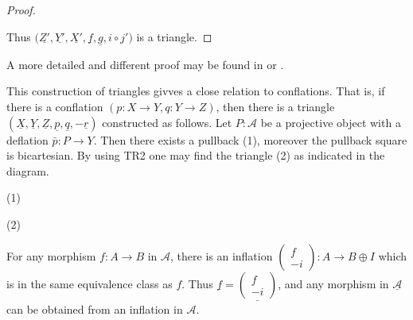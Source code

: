 \begin{proof}
\begin{center}
        \end{center}
        Thus $(\underline{Z'},\underline{Y'},\underline{X'},\underline{f},\underline{g},$\underline{\upside{$\Omega$}$i\circ j'$}$)$ is a triangle. 
    \end{proof}

    \begin{remark}
        A more detailed and different proof may be found in \cite{Hol12} or \cite{Mat20}.
    \end{remark}

    This construction of triangles givves a close relation to conflations. That is, if there is a conflation $(p:X\rightarrow Y,q:Y\rightarrow Z)$, then there is a triangle $(\underline{X},\underline{Y},\underline{Z},\underline{p},\underline{q},-\underline{r})$ constructed as follows. Let $P:\mathcal{A}$ be a projective object with a deflation $\bar{p}:P\rightarrow Y$. Then there exists a pullback (1), moreover the pullback square is bicartesian. By using TR2 one may find the triangle (2) as indicated in the diagram.
    \begin{center}
        (1)
        (2)
    \end{center}

    \begin{remark}
        For any morphism $f:A\rightarrow B$ in $\mathcal{A}$, there is an inflation $\begin{pmatrix}f \\ -i \end{pmatrix}:A\rightarrow B\oplus I$ which is in the same equivalence class as $f$. Thus $\underline{f}=\underline{\begin{pmatrix}f \\ -i \end{pmatrix}}$, and any morphism in $\underline{\mathcal{A}}$ can be obtained from an inflation in $\mathcal{A}$.
    \end{remark}

